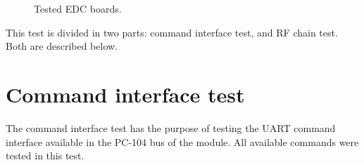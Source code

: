\begin{figure}[!htb]
    \begin{center}

        \caption{Tested EDC boards.}
        \label{fig:edc-boards-test}
    \end{center}
\end{figure}

This test is divided in two parts: command interface test, and RF chain test. Both are described below.

\section{Command interface test}

The command interface test has the purpose of testing the UART command interface available in the PC-104 bus of the module. All available commands were tested in this test.

